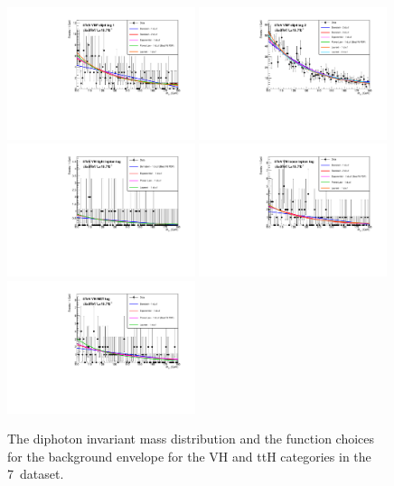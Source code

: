 \begin{figure}
  \includegraphics[width=0.49\textwidth]{analysis/plots/multipdf_plots/cat6_8TeV.pdf}
  \includegraphics[width=0.49\textwidth]{analysis/plots/multipdf_plots/cat7_8TeV.pdf}\\
  \includegraphics[width=0.49\textwidth]{analysis/plots/multipdf_plots/cat8_8TeV.pdf}
  \includegraphics[width=0.49\textwidth]{analysis/plots/multipdf_plots/cat9_8TeV.pdf}\\
  \includegraphics[width=0.49\textwidth]{analysis/plots/multipdf_plots/cat10_8TeV.pdf}
  \caption{The diphoton invariant mass distribution and the function choices for the background envelope for the \acs{VH} and \acs{ttH} categories in the 7~\TeV dataset.}
  \label{fig:multipdf3}
\end{figure}

